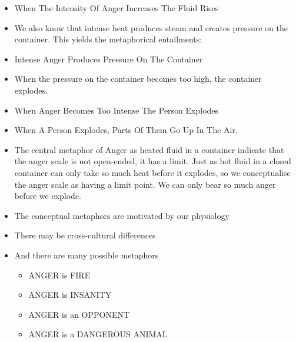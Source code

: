 \documentclass[headrule,footrule]{foils}
\begin{document}
\begin{itemize}
\item When The Intensity Of Anger Increases The Fluid Rises
\begin{exe}
  \ex {}
  \ex {}
  \ex {}
  \ex {}
  \ex {}
\end{exe}
\newpage
\item We also know that intense heat produces steam and creates pressure on the
container. This yields the metaphorical entailments:
\item Intense Anger Produces Pressure On The Container
  \begin{exe}
    \ex {}
    \ex {}
    \ex {}
    \ex {}
    \ex {}
    \ex {}
\end{exe}
\newpage
\item  When the pressure on the container becomes too high, the container explodes.
\item When Anger Becomes Too Intense The Person Explodes
  \begin{exe}
    \ex {}
  \ex {}
  \ex {}
  \ex {}
  \ex {}
  \ex {}
\end{exe}
\newpage
\item When A Person Explodes, Parts Of Them Go Up In The Air.
  \begin{exe}
  \ex {}
  \ex {}
  \ex {}
  \ex {}
  \ex {}
\end{exe}

\newpage

\item The central metaphor of Anger as heated fluid in a container indicate
that the anger scale is not open-ended, it has a limit. Just as hot
fluid in a closed container can only take so much heat before it
explodes, so we conceptualise the anger scale as having a limit
point. We can only bear so much anger before we explode.
\item The conceptual metaphors are motivated by our physiology
\item There may be cross-cultural differences
\item And there are many possible metaphors

\begin{itemize}
\item ANGER is FIRE
\item ANGER is INSANITY
\item ANGER is an OPPONENT
\item ANGER is a DANGEROUS ANIMAL
\end{itemize}

\end{itemize}
\end{document}
